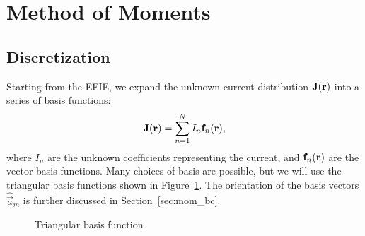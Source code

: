 \section{Method of Moments}

\subsection{Discretization}
Starting from the EFIE, we expand the unknown current distribution $\mathbf{J}(\mathbf{r})$ into a series of basis functions:
\begin{equation}
	\mathbf{J}(\mathbf{r}) = \sum_{n = 1}^{N} I_n \mathbf{f}_n(\mathbf{r}),
	\label{eq:j_exp}
\end{equation}
where $I_n$ are the unknown coefficients representing the current, and $\mathbf{f}_n(\mathbf{r})$ are the vector basis functions. Many choices of basis are possible, but we will use the triangular basis functions shown in Figure~\ref{fig:mom_basis}. The orientation of the basis vectors $\hat{\vec{a}}_m$ is further discussed in Section~\ref{sec:mom_bc}.
\begin{figure}[!ht]
	\centering
	
	\caption{Triangular basis function}
	\label{fig:mom_basis}
\end{figure}

